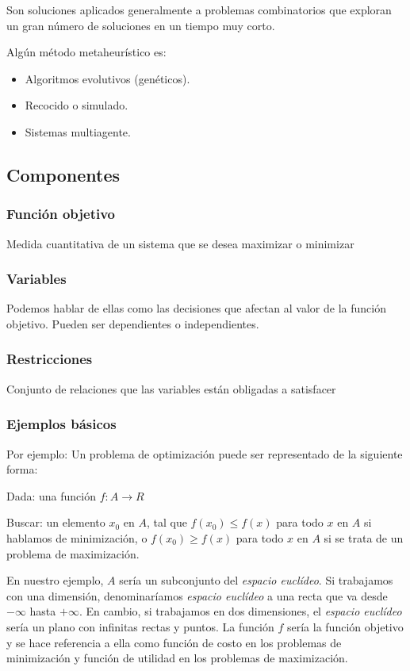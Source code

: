 Son soluciones aplicados generalmente a problemas combinatorios que exploran un gran número de soluciones en un tiempo muy corto.

Algún método metaheurístico es:
\begin{itemize}
	\item Algoritmos evolutivos (genéticos).
	\item Recocido o simulado.
	\item Sistemas multiagente.
\end{itemize}

\subsection{Componentes~\cite{pdf:optimizacion}}

\subsubsection{Función objetivo}
Medida cuantitativa de un sistema que se desea maximizar o minimizar

\subsubsection{Variables}
Podemos hablar de ellas como las decisiones que afectan al valor de la función objetivo. Pueden ser dependientes o independientes.
\subsubsection{Restricciones}
Conjunto de relaciones que las variables están obligadas a satisfacer

\subsubsection{Ejemplos básicos}

Por ejemplo: Un problema de optimización puede ser representado de la siguiente forma:

Dada: una función $f : A \rightarrow R$

Buscar: un elemento $x_{0}$ en $A$, tal que $f(x_{0}) \leq f(x)$ para todo $x$ en $A$ si hablamos de minimización, o $f(x_{0}) \geq f(x)$ para todo $x$ en $A$ si se trata de un problema de maximización.

En nuestro ejemplo, $A$ sería un subconjunto del \textit{espacio euclídeo}. Si trabajamos con una dimensión, denominaríamos \textit{espacio euclídeo} a una recta que va desde $-\infty$ hasta $+\infty$. En cambio, si trabajamos en dos dimensiones, el \textit{espacio euclídeo} sería un plano con infinitas rectas y puntos.
La función $f$ sería la función objetivo y se hace referencia a ella como función de costo en los problemas de 
minimización y función de utilidad en los problemas de maximización.

